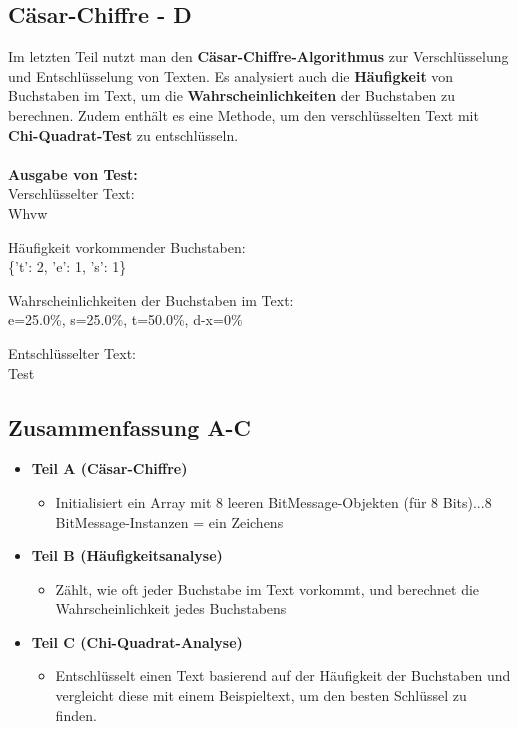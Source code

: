 \subsection*{Cäsar-Chiffre - D}
Im letzten Teil nutzt man den \textbf{Cäsar-Chiffre-Algorithmus} zur Verschlüsselung und Entschlüsselung von Texten. Es analysiert auch die \textbf{Häufigkeit} von Buchstaben im Text, um die \textbf{Wahrscheinlichkeiten} der Buchstaben zu berechnen. Zudem enthält es eine Methode, um den verschlüsselten Text mit \textbf{Chi-Quadrat-Test} zu entschlüsseln.\\\\
\textbf{Ausgabe von Test:}\\
Verschlüsselter Text:\\
Whvw\par
Häufigkeit vorkommender Buchstaben:\\
\{'t': 2, 'e': 1, 's': 1\}\par
Wahrscheinlichkeiten der Buchstaben im Text:\\
e=25.0\%, s=25.0\%, t=50.0\%, d-x=0\%\par
Entschlüsselter Text:\\
Test\\
\begin{codeblock}
    
\end{codeblock}

\subsection*{Zusammenfassung A-C}
\begin{itemize}[itemsep=0pt]
   \item \textbf{Teil A (Cäsar-Chiffre)} 
   \begin{itemize}
    \item Initialisiert ein Array mit 8 leeren BitMessage-Objekten (für 8 Bits)...8 BitMessage-Instanzen = ein Zeichens
   \end{itemize}
   \item \textbf{Teil B (Häufigkeitsanalyse)} 
   \begin{itemize}
    \item Zählt, wie oft jeder Buchstabe im Text vorkommt, und berechnet die Wahrscheinlichkeit jedes Buchstabens
   \end{itemize}
   \item \textbf{Teil C (Chi-Quadrat-Analyse)} 
   \begin{itemize}
    \item Entschlüsselt einen Text basierend auf der Häufigkeit der Buchstaben und vergleicht diese mit einem Beispieltext, um den besten Schlüssel zu finden.
   \end{itemize}
\end{itemize}